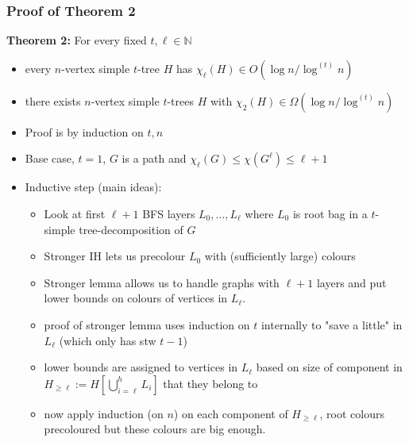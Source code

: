 \documentclass[xcolor=dvipsnames]{beamer}
\newcommand{\N}{\mathbb{N}}
\begin{document}
\begin{frame}
  \frametitle{Proof of Theorem 2}

  \textbf{Theorem 2:} For every fixed $t,\ell\in\N$ 
  \begin{itemize}
    \item every $n$-vertex simple $t$-tree $H$ has $\chi_\ell(H)\in O(\log n/\log^{(t)} n)$
    \item there exists $n$-vertex simple $t$-trees $H$ with $\chi_2(H)\in\Omega(\log n/\log^{(t)} n)$
  \end{itemize}
  
  \begin{itemize}
    \item Proof is by induction on $t,n$
    \item Base case, $t=1$, $G$ is a path and $\chi_\ell(G)\le\chi(G^\ell)\le\ell+1$
    \item Inductive step (main ideas):
    \begin{itemize}
      \item Look at first $\ell+1$ BFS layers $L_0,\ldots,L_\ell$ where $L_0$ is root bag in a $t$-simple tree-decomposition of $G$
      \item Stronger IH lets us precolour $L_0$ with (sufficiently large) colours
      \item Stronger lemma allows us to handle graphs with $\ell+1$ layers and put lower bounds on colours of vertices in $L_\ell$. 
      \item proof of stronger lemma uses induction on $t$ internally to "save a little" in $L_{\ell}$ (which only has stw $t-1$)
      \item lower bounds are assigned to vertices in $L_{\ell}$ based on size of component in $H_{\ge\ell}:=H[\bigcup_{i={\ell}}^h L_i]$ that they belong to
      \item now apply induction (on $n$) on each component of $H_{\ge\ell}$, root colours precoloured but these colours are big enough.
    \end{itemize}
  \end{itemize}
  
\end{frame}
\end{document}
